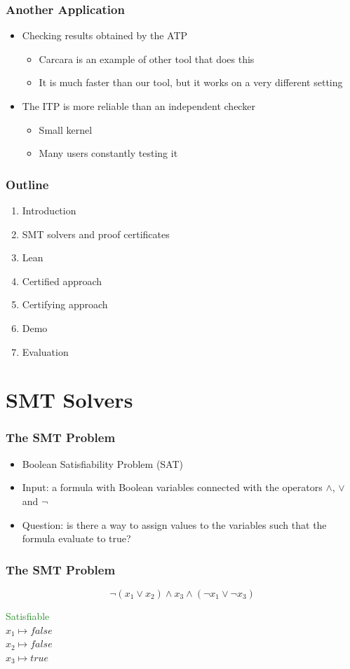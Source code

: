\documentclass[usepdftitle=false,aspectratio=169,usenames,dvipsnames]{beamer}
\newcommand{\bluecheck}{{\color{blue}\checkmark}}
\newcommand\vitem{\vfill\item}
\begin{document}
\begin{frame}
  \frametitle{Another Application}
  \begin{itemize}
    \item Checking results obtained by the ATP
    \begin{itemize}
      \item Carcara is an example of other tool that does this
      \item It is much faster than our tool, but it works on a very different setting
    \end{itemize}
    \vitem The ITP is more reliable than an independent checker
    \begin{itemize}
      \item Small kernel
      \item Many users constantly testing it
    \end{itemize}
  \end{itemize}
\end{frame}



\begin{frame}
  \frametitle{Outline}
  \begin{enumerate}
    \item Introduction \bluecheck
    \vitem SMT solvers and proof certificates
    \vitem Lean
    \vitem Certified approach
    \vitem Certifying approach
    \vitem Demo
    \vitem Evaluation
  \end{enumerate}
\end{frame}

\section{SMT Solvers}

\begin{frame}
  \frametitle{The SMT Problem}
  \begin{itemize}
    \item Boolean Satisfiability Problem (SAT)
    \vitem Input: a formula with Boolean variables connected with the operators $\wedge$, $\vee$ and $\neg$
    \vitem Question: is there a way to assign values to the variables such that the formula evaluate to true?
  \end{itemize}
\end{frame}


\begin{frame}
  \frametitle{The SMT Problem}
  \begin{overprint}
    \medskip
    $$\neg (x_{1} \vee x_{2}) \wedge x_{3} \wedge (\neg x_{1} \vee \neg x_{3})$$
  \end{overprint}
  \vfill
  \begin{overprint}
    \begin{center}
      \textcolor{ForestGreen}{Satisfiable}\\
    $x_{1} \mapsto false$ \\
    $x_{2} \mapsto false$ \\
    $x_{3} \mapsto true$
    \end{center}
  \end{overprint}
\end{frame}
\end{document}
